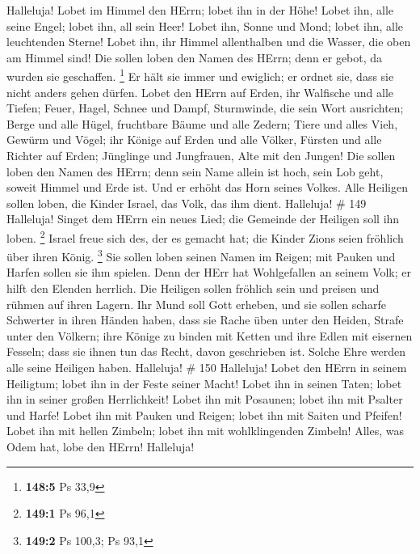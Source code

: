  Halleluja! Lobet im Himmel den HErrn; lobet ihn in der
Höhe!  Lobet ihn, alle seine Engel; lobet ihn, all sein
Heer!  Lobet ihn, Sonne und Mond; lobet ihn, alle
leuchtenden Sterne!  Lobet ihn, ihr Himmel allenthalben und
die Wasser, die oben am Himmel sind!  Die sollen loben den
Namen des HErrn; denn er gebot, da wurden sie geschaffen. \footnote{\textbf{148:5}
  Ps 33,9}  Er hält sie immer und ewiglich; er ordnet sie,
dass sie nicht anders gehen dürfen.  Lobet den HErrn auf
Erden, ihr Walfische und alle Tiefen;  Feuer, Hagel, Schnee
und Dampf, Sturmwinde, die sein Wort ausrichten;  Berge und
alle Hügel, fruchtbare Bäume und alle Zedern;  Tiere und
alles Vieh, Gewürm und Vögel;  ihr Könige auf Erden und
alle Völker, Fürsten und alle Richter auf Erden;  Jünglinge
und Jungfrauen, Alte mit den Jungen!  Die sollen loben den
Namen des HErrn; denn sein Name allein ist hoch, sein Lob geht, soweit
Himmel und Erde ist.  Und er erhöht das Horn seines Volkes.
Alle Heiligen sollen loben, die Kinder Israel, das Volk, das ihm dient.
Halleluja! \# 149  Halleluja! Singet dem HErrn ein neues
Lied; die Gemeinde der Heiligen soll ihn loben. \footnote{\textbf{149:1}
  Ps 96,1}  Israel freue sich des, der es gemacht hat; die
Kinder Zions seien fröhlich über ihren König. \footnote{\textbf{149:2}
  Ps 100,3; Ps 93,1}  Sie sollen loben seinen Namen im
Reigen; mit Pauken und Harfen sollen sie ihm spielen.  Denn
der HErr hat Wohlgefallen an seinem Volk; er hilft den Elenden herrlich.
 Die Heiligen sollen fröhlich sein und preisen und rühmen
auf ihren Lagern.  Ihr Mund soll Gott erheben, und sie
sollen scharfe Schwerter in ihren Händen haben,  dass sie
Rache üben unter den Heiden, Strafe unter den Völkern;  ihre
Könige zu binden mit Ketten und ihre Edlen mit eisernen Fesseln;
 dass sie ihnen tun das Recht, davon geschrieben ist. Solche
Ehre werden alle seine Heiligen haben. Halleluja! \# 150 
Halleluja! Lobet den HErrn in seinem Heiligtum; lobet ihn in der Feste
seiner Macht!  Lobet ihn in seinen Taten; lobet ihn in
seiner großen Herrlichkeit!  Lobet ihn mit Posaunen; lobet
ihn mit Psalter und Harfe!  Lobet ihn mit Pauken und Reigen;
lobet ihn mit Saiten und Pfeifen!  Lobet ihn mit hellen
Zimbeln; lobet ihn mit wohlklingenden Zimbeln!  Alles, was
Odem hat, lobe den HErrn! Halleluja!
